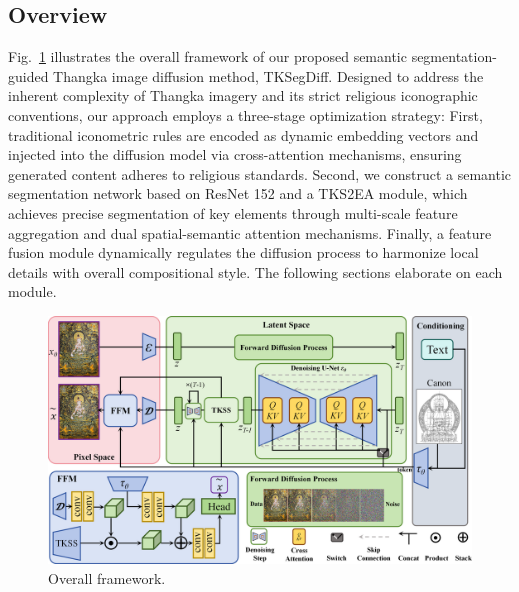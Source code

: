 \documentclass[sn-mathphys]{sn-jnl}%
\theoremstyle{thmstyleone}%
\theoremstyle{thmstyletwo}%
\theoremstyle{thmstylethree}%
\begin{document}
\subsection{Overview}
Fig.~\ref{fig3} illustrates the overall framework of our proposed semantic segmentation-guided Thangka image diffusion method, TKSegDiff. Designed to address the inherent complexity of Thangka imagery and its strict religious iconographic conventions, our approach employs a three-stage optimization strategy: First, traditional iconometric rules are encoded as dynamic embedding vectors and injected into the diffusion model via cross-attention mechanisms, ensuring generated content adheres to religious standards. Second, we construct a semantic segmentation network based on ResNet 152 and a TKS2EA module, which achieves precise segmentation of key elements through multi-scale feature aggregation and dual spatial-semantic attention mechanisms. Finally, a feature fusion module dynamically regulates the diffusion process to harmonize local details with overall compositional style. The following sections elaborate on each module.
\begin{figure}[htbp]
	\centerline{\includegraphics[width=1\linewidth]{fig3.png}}
	\caption{Overall framework.}
	\label{fig3}
\end{figure}
\end{document}
